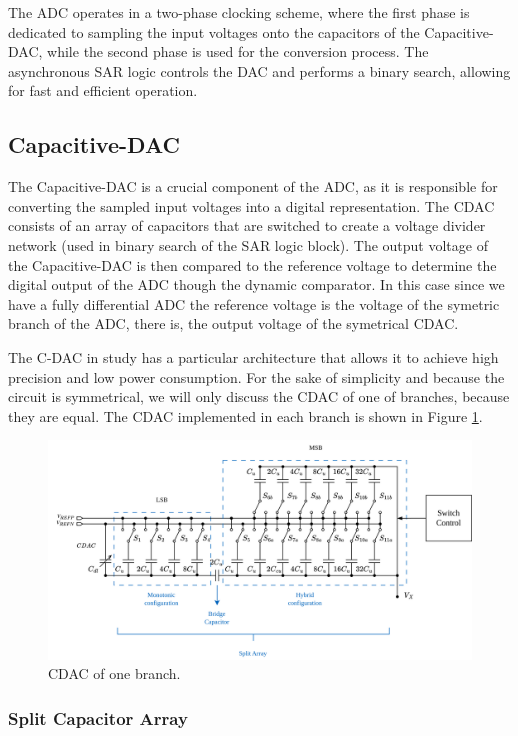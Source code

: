 The ADC operates in a two-phase clocking scheme, where the first phase is dedicated to sampling the input voltages onto the capacitors of the Capacitive-DAC, while the second phase is used for the conversion process. The asynchronous SAR logic controls the DAC and performs a binary search, allowing for fast and efficient operation.

\subsection{Capacitive-DAC}
\label{sec:CDAC}
The Capacitive-DAC is a crucial component of the ADC, as it is responsible for converting the sampled input voltages into a digital representation. The CDAC consists of an array of capacitors that are switched to create a voltage divider network (used in binary search of the SAR logic block). The output voltage of the Capacitive-DAC is then compared to the reference voltage to determine the digital output of the ADC though the dynamic comparator. In this case since we have a fully differential ADC the reference voltage is the voltage of the symetric branch of the ADC, there is, the output voltage of the symetrical CDAC.

The C-DAC in study has a particular architecture that allows it to achieve high precision and low power consumption. 
For the sake of simplicity and because the circuit is symmetrical, we will only discuss the CDAC of one of branches, because they are equal. The CDAC implemented in each branch is shown in Figure \ref{fig:CDAC-sch}. 

\begin{figure}[h]
    \centering
    \includegraphics[width=1\textwidth]{Images/CDAC-sch.png}
    \caption{CDAC of one branch.}
    \label{fig:CDAC-sch}
\end{figure}

\subsubsection{Split Capacitor Array}

